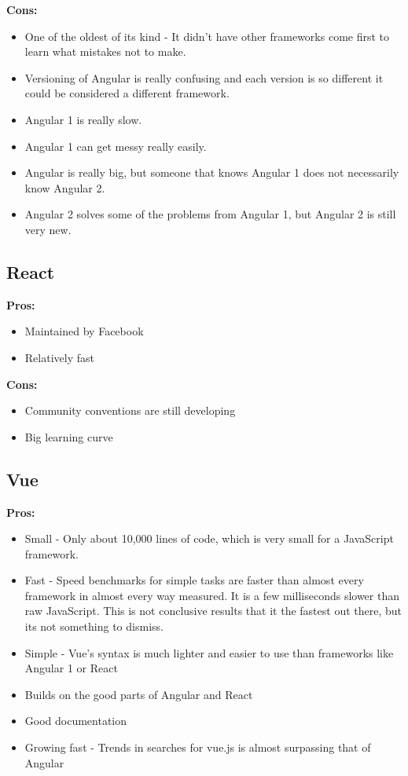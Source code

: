 \documentclass[draftclsnofoot,onecolumn,letterpaper,10pt,compsoc]{IEEEtran}
\begin{document}
    \textbf{Cons:}

    \begin{itemize}
      \item One of the oldest of its kind - It didn't have other frameworks come first to learn what mistakes not to make.
      \item Versioning of Angular is really confusing and each version is so different it could be considered a different framework.
      \item Angular 1 is really slow.
      \item Angular 1 can get messy really easily.
      \item Angular is really big, but someone that knows Angular 1 does not necessarily know Angular 2.
      \item Angular 2 solves some of the problems from Angular 1, but Angular 2 is still very new.
    \end{itemize}


	\subsection{React}
    \textbf{Pros:}
    \begin{itemize}
      \item Maintained by Facebook
      \item Relatively fast
    \end{itemize}

    \textbf{Cons:}
    \begin{itemize}
      \item Community conventions are still developing
      \item Big learning curve
    \end{itemize}


  \subsection{Vue}

    \textbf{Pros:}
    \begin{itemize}
      \item Small - Only about 10,000 lines of code, which is very small for a JavaScript framework.
      \item Fast - Speed benchmarks for simple tasks are faster than almost every framework in almost every way measured. It is a few milliseconds slower than raw JavaScript. This is not conclusive results that it the fastest out there, but its not something to dismiss.\cite{SpeedReport}
      \item Simple - Vue's syntax is much lighter and easier to use than frameworks like Angular 1 or React
      \item Builds on the good parts of Angular and React
      \item Good documentation
      \item Growing fast - Trends in searches for vue.js is almost surpassing that of Angular
    \end{itemize}
\end{document}
